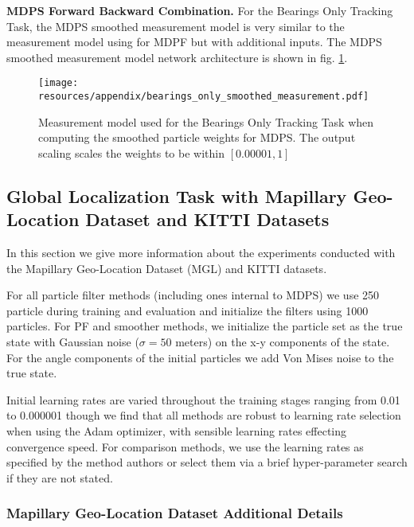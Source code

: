         \textbf{MDPS Forward Backward Combination.} For the Bearings Only Tracking Task, the MDPS smoothed measurement model is very similar to the measurement model using for MDPF but with additional inputs. The MDPS smoothed measurement model network architecture is shown in fig. \ref{appx_fig:bearings_only_smoothed_measurement}.

        
        \begin{figure}[ht]
            \centering
            \texttt{[image: resources/appendix/bearings\_only\_smoothed\_measurement.pdf]}
            \caption{\small{Measurement model used for the Bearings Only Tracking Task when computing the smoothed particle weights for MDPS. The output scaling scales the weights to be within $[0.00001, 1]$}}
            \label{appx_fig:bearings_only_smoothed_measurement}
        \end{figure}


\subsection{Global Localization Task with Mapillary Geo-Location Dataset and KITTI Datasets}

    In this section we give more information about the experiments conducted with the Mapillary Geo-Location Dataset (MGL)\cite{sarlin2023orienternet} and KITTI \cite{Geiger2013IJRRKitti} datasets.

    For all particle filter methods (including ones internal to MDPS) we use 250 particle during training and evaluation and initialize the filters using 1000 particles. For PF and smoother methods, we initialize the particle set as the true state with Gaussian noise ($\sigma=50$ meters) on the x-y components of the state. For the angle components of the initial particles we add Von Mises noise to the true state.
    
    Initial learning rates are varied throughout the training stages ranging from 0.01 to 0.000001 though we find that all methods are robust to learning rate selection when using the Adam \cite{DBLP:journals/corr/KingmaB14} optimizer, with sensible learning rates effecting convergence speed. For comparison methods, we use the learning rates as specified by the method authors or select them via a brief hyper-parameter search if they are not stated.

    \subsubsection{Mapillary Geo-Location Dataset Additional Details}

